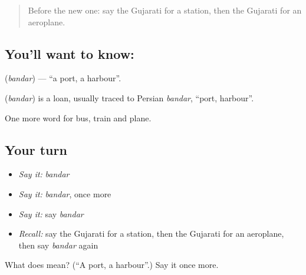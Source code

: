 \label{lesson:GU-C85-port}



\begin{quote}
Before the new one: say the Gujarati for a station, then the Gujarati for an aeroplane.
\end{quote}

\subsection*{You'll want to know: }
\textbf{} (\emph{bandar}) — \textquotedblleft{}a port, a harbour\textquotedblright{}.

\begin{cousinweb}
\textbf{} (\emph{bandar}) is a loan, usually traced to Persian \emph{bandar}, \textquotedblleft{}port, harbour\textquotedblright{}.
\end{cousinweb}

\begin{grammarlens}[title={What you've built}]
One more word for bus, train and plane.
\end{grammarlens}

\subsection*{Your turn}
\begin{itemize}
\raggedright
  \item \emph{Say it:} \emph{bandar}
  \item \emph{Say it:} \emph{bandar}, once more
  \item \emph{Say it:} say \emph{bandar}
  \item \emph{Recall:} say the Gujarati for a station, then the Gujarati for an aeroplane, then say \emph{bandar} again
\end{itemize}

\begin{tcolorbox}[breakable,colback=teal!4,colframe=teal!35!black,title={Before you move on}]
What does  mean? (\textquotedblleft{}A port, a harbour\textquotedblright{}.) Say it once more.
\end{tcolorbox}
